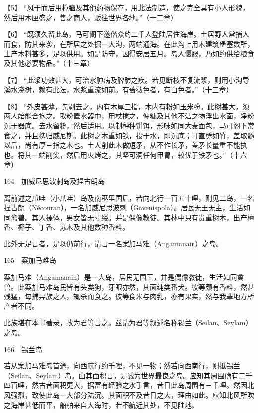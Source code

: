 \documentclass[12pt,UTF8]{ctexbook}
\begin{document}
【5】 “风干而后用樟脑及其他药物保存，用此法制造，使之完全具有小人形貌，然后用木匣盛之，售之商人，贩往世界各地。”（十二章）

【6】 “既须久留此岛，马可阁下遂偕众约二千人登陆居住海岸。土居野人常捕人而食，防其来袭，在所居之处掘一大沟，两端通海。在此沟上用木建筑堡塞数所，土产木料甚多，足以供用。如是防守，因得安居五月。岛人慑服，乃如约供给粮食及其他必要物品。”（十三章）

【7】 “此浆功效甚大，可治水肿病及脾肺之疾。若见断枝不复流浆，则用小沟导溪水浇树，赖有此法，水浆重流如前。有蔷薇色者，有白色者。”（十三章）

【8】 “外皮甚薄，先剥去之，内有木厚三指，木内有粉如玉米粉。此树甚大，须两人始能合抱之。取粉置水器中，用杖搅之，俾糠及其他不洁之物浮出水面，净粉沉于器底。去水留粉，然后适用。以制种种饼饵，形味如同大麦面包，马可阁下常食之，并且携归威尼斯。此树之木重如铁，投于水，即沉底；可直劈如竹，盖取髓以后，尚有厚三指之木也。土人削此木做短矛，从不作长矛，盖矛长量重不能执也。将其一端削尖，然后用火烤之，其坚可洞任何甲胄，较优于铁矛也。”（十六章）





164　加威尼思波剌岛及捏古朗岛

离前述之爪哇（小爪哇）岛及南巫里国后，若向北行一百五十哩，则见二岛，一名捏古朗（Nécouran），一名加威尼思波剌（Gavenispola）。居民无王无主，生活如同禽兽。其人裸体，男女皆无寸缕。并是偶像教徒。其林中只有贵重树木，出产檀香、椰子、丁香、苏木及其他数种香料。

此外无足言者，是以仍前行，请言一名案加马难（Angamanain）之岛。





165　案加马难岛

案加马难（Angamanain）是一大岛，居民无国王，并是偶像教徒，生活如同禽兽。此案加马难岛民皆有头类狗，牙眼亦然，其面纯类番犬。彼等颇有香料，然甚残猛，每捕异族之人，辄杀而食之。彼等食米与肉乳，亦有果实，然与我辈地方所产者不同。

此族堪在本书著录，故为君等言之。兹请为君等叙述名称锡兰（Seilan、Seylam）之岛。





166　锡兰岛

若从案加马难岛首途，向西航行约千哩，不见一物；然若向西南行，则抵锡兰（Seilan、Seylam）岛。由其面积言，是诚为世界最良之岛。应知其周围确有二千四百哩，然古昔面积更大，据富有经验之水手言，昔日此岛周围有三千哩。然因北风强烈，致使此岛一大部分陆沉。其面积不及昔日之大，理由如此。应知北风所吹之海岸甚低而平，船舶来自大海时，若不航近其处，不见陆地。
\end{document}

